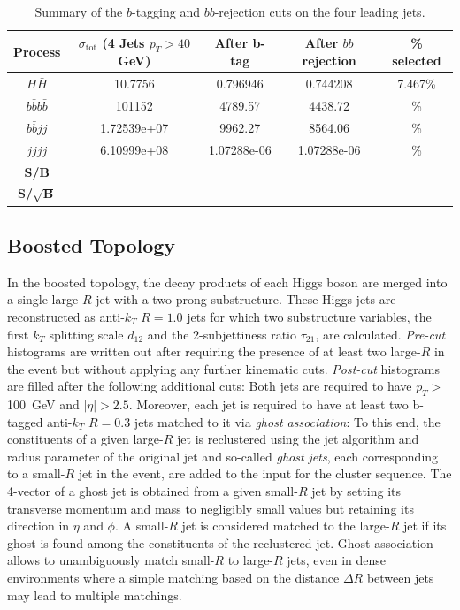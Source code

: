 \documentclass[12pt]{article}
\begin{document}
\begin{table}[h]
\begin{center}
\begin{tabular}{|c|c|c|c|c|}
\hline
Process & $\sigma_{\mathrm{tot}}$ (4 Jets $p_T>40$ GeV) & After b-tag & After $bb$ rejection & \% selected  \\
\hline \hline
$H\bar{H}$ &10.7756 & 0.796946 & 0.744208 & 7.467\% \\
\hline
$b\bar{b}b\bar{b}$ & 101152 & 4789.57 & 4438.72 & \% \\
$b\bar{b}jj$ & 1.72539e+07 & 9962.27 & 8564.06 & \% \\
$jjjj$ & 6.10999e+08 & 1.07288e-06 & 1.07288e-06 & \% \\
\hline
\textbf{S/B} & & & & \multicolumn{1}{c}{}\\
\cline{1-3}
\textbf{S/$\sqrt{\mathrm{\textbf{B}}}$} & & & & \multicolumn{1}{c}{}\\
\cline{1-3}
\end{tabular}
\end{center}
\caption{Summary of the $b$-tagging and $bb$-rejection cuts on the four leading jets.}\label{tab:TestbbTagUCL}
\end{table}%



\subsection{Boosted Topology}\label{sec:Boosted_FR}

In the boosted topology, the decay products of each Higgs boson are merged into a single large-$R$ jet with a two-prong substructure. 
These Higgs jets are reconstructed as anti-$k_T$ $R=1.0$ jets for which two substructure variables, the first $k_T$ splitting scale $d_{12}$
and the 2-subjettiness ratio $\tau_{21}$, are calculated.
\textit{Pre-cut} histograms are written out after requiring the presence of at least two large-$R$ in the event but without applying any further
kinematic cuts. \textit{Post-cut} histograms are filled after the following additional cuts: 
Both jets are required to have $p_T >$100~GeV and $|\eta|>2.5$. Moreover, each jet is required to have at least two b-tagged anti-$k_T$ $R=0.3$ 
jets matched to it via \textit{ghost association}: 
To this end, the constituents of a given large-$R$ jet is reclustered using the jet algorithm 
and radius parameter of the original jet and so-called \textit{ghost jets}, each corresponding to a small-$R$ jet in the event, 
are added to the input for the cluster sequence. The 4-vector of a ghost jet is obtained from a given small-$R$ jet 
by setting its transverse momentum and mass to negligibly small values but retaining its direction in $\eta$ and $\phi$. A small-$R$ jet is 
considered matched to the large-$R$ jet if its ghost is found among the constituents of the reclustered jet. Ghost association allows to unambiguously
match small-$R$ to large-$R$ jets, even in dense environments where a simple matching based on the distance $\Delta R$ between jets 
may lead to multiple matchings.
\end{document}
